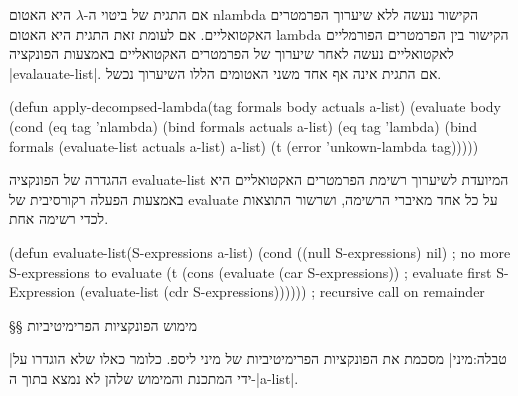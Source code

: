 אם התגית של ביטוי ה-$λ$ היא האטום nlambda הקישור נעשה ללא שיערוך הפרמטרים
האקטואליים. אם לעומת זאת התגית היא האטום lambda הקישור בין הפרמטרים הפורמליים
לאקטואליים נעשה לאחר שיערוך של הפרמטרים האקטואליים באמצעות הפונקציה
\E|evalauate-list|. אם התגית אינה אף אחד משני האטומים הללו השיערוך נכשל.
\begin{KERNEL}
(defun apply-decompsed-lambda(tag formals body actuals a-list)
  (evaluate body
    (cond (eq tag 'nlambda) (bind formals actuals a-list)
          (eq tag 'lambda) (bind formals (evaluate-list actuals a-list) a-list)
          (t (error 'unkown-lambda tag)))))
\end{KERNEL}

ההגדרה של הפונקציה evaluate-list המיועדת לשיערוך רשימת הפרמטרים האקטואליים היא
באמצעות הפעלה רקורסיבית של evaluate על כל אחד מאיברי הרשימה, ושרשור התוצאות
לכדי רשימה אחת.
\begin{KERNEL}
(defun evaluate-list(S-expressions a-list)
  (cond ((null S-expressions) nil) ; no more S-expressions to evaluate
    (t (cons
          (evaluate (car S-expressions)) ; evaluate first S-Expression
          (evaluate-list (cdr S-expressions)))))) ; recursive call on remainder
\end{KERNEL}

§§ מימוש הפונקציות הפרימיטיביות

|טבלה:מיני| מסכמת את הפונקציות הפרימיטיביות של מיני ליספ. כלומר כאלו שלא
הוגדרו על ידי המתכנת והמימוש שלהן לא נמצא בתוך ה-\E|a-list|.

